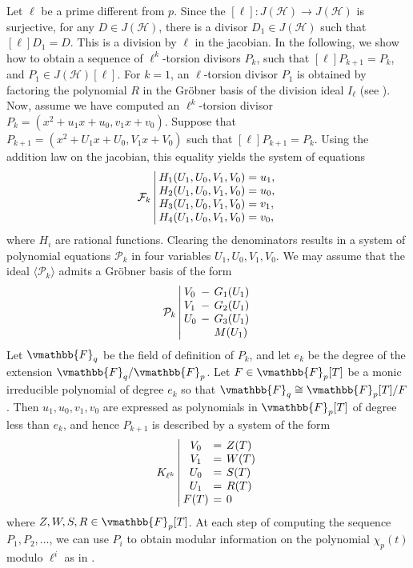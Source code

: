 Let $\ell$ be a prime different from $p$. Since the $[\ell]: J(\mathcal{H}) \rightarrow 
J(\mathcal{H})$ is surjective, for any $D \in J(\mathcal{H})$, there is a divisor $D_1 \in 
J(\mathcal{H})$ such that $[\ell]D_1 = D$. This is a division by $\ell$ in the jacobian. In the 
following, we show how to obtain a sequence of $\ell^k$-torsion divisors $P_k$, such that 
$[\ell]P_{k + 1} = P_k$, and $P_1 \in J(\mathcal{H})[\ell]$. For $k = 1$, an $\ell$-torsion divisor 
$P_1$ is obtained by factoring the polynomial $R$ in the Gr\"{o}bner basis of the division ideal 
$I_\ell$ (see ). Now, assume we have computed an $\ell^k$-torsion 
divisor $P_k = (x^2 + u_1x + u_0, v_1x + v_0)$. Suppose that $P_{k + 1} = (x^2 + U_1x + U_0, V_1x + 
V_0)$ such that $[\ell]P_{k + 1} = P_k$. Using the addition law on the jacobian, this equality 
yields the system of equations
$$
\mathcal{F}_k \left|
\setlength\arraycolsep{2pt}
\begin{array}{l}
H_1(U_1, U_0, V_1, V_0) = u_1, \\
H_2(U_1, U_0, V_1, V_0) = u_0, \\
H_3(U_1, U_0, V_1, V_0) = v_1, \\
H_4(U_1, U_0, V_1, V_0) = v_0, \\
\end{array}
\right.
$$
where $H_i$ are rational functions. Clearing the denominators results in a system of polynomial 
equations $\mathcal{P}_k$ in four variables $U_1, U_0, V_1, V_0$. We may assume that the ideal 
$\langle \mathcal{P}_k \rangle$ admits a Gr\"{o}bner basis of the form
$$
\mathcal{P}_k \left|
\setlength\arraycolsep{2pt}
\begin{array}{lll}
V_0 & - & G_1(U_1) \\
V_1 & - & G_2(U_1) \\
U_0 & - & G_3(U_1) \\
&& M(U_1) 
\end{array}
\right.
$$
Let $\vmathbb{F}_q$ be the field of definition of $P_k$, and let $e_k$ be the degree of the extension 
$\vmathbb{F}_q / \vmathbb{F}_p$. Let $F \in \vmathbb{F}_p[T]$ be a monic irreducible polynomial of 
degree $e_k$ so that $\vmathbb{F}_q \cong \vmathbb{F}_p[T] / F$. Then $u_1, u_0, v_1, v_0$ are 
expressed as polynomials in $\vmathbb{F}_p[T]$ of degree less than $e_k$, and hence $P_{k + 1}$ is 
described by a system of the form
$$
K_{\ell^k} \left|
\setlength\arraycolsep{2pt}
\begin{array}{cll}
V_0 & = & Z(T) \\
V_1 & = & W(T) \\
U_0 & = & S(T) \\
U_1 & = & R(T) \\
F(T) & = & 0
\end{array}
\right.
$$
where $Z, W, S, R \in \vmathbb{F}_p[T]$. At each step of computing the sequence $P_1, P_2, \dots$, we 
can use $P_{i}$ to obtain modular information on the polynomial $\chi_p(t)$ modulo $\ell^i$ as in 
.









